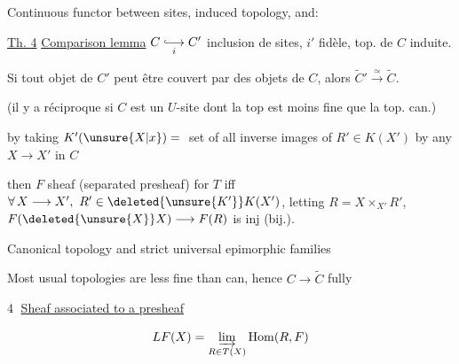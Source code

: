 Continuous functor between sites, induced topology, and:


\uline{Th. 4} \uline{Comparison lemma} $C\underset{i}{\lhook\joinrel\longrightarrow}C'$  inclusion de sites, $i'$  fidèle, top. de $C$ induite.

Si tout objet de $C'$ peut être couvert par des objets de $C$, alors $\widetilde C'\xrightarrow{\simeq}\widetilde C$.

(il y a réciproque si $C$ est un $U$-site dont la top est moins fine que la top. can.)

by taking  $K'(\unsure{X|x})={}$ set of all inverse images of $R'\in K(X')$ by any $X\longrightarrow X'$ in $C$

then $F$  sheaf (separated presheaf) for $T$ iff  $\forall\,X\longrightarrow X',\ R'\in \deleted{\unsure{K'}}K(X')$, letting $R=X\times_{X'}R'$, $F(\deleted{\unsure{X}}X)\longrightarrow F(R)$ is inj (bij.).

Canonical topology and strict universal epimorphic families

 Most usual topologies are less fine than can, hence $C\longrightarrow\widetilde C$ fully 


\textcircled{4} \uline{Sheaf associated to a presheaf}

\[ LF(X)=\varinjlim_{R\in T(X)}\operatorname{Hom}(R,F) \]



